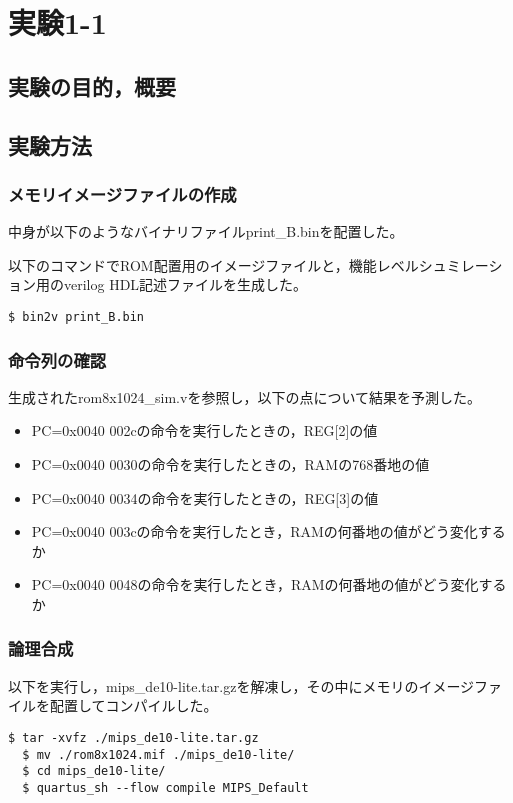 
\section{実験1-1}
\subsection{実験の目的，概要}

\subsection{実験方法}
\subsubsection{メモリイメージファイルの作成}
中身が以下のようなバイナリファイルprint\_B.binを配置した。


以下のコマンドでROM配置用のイメージファイルと，機能レベルシュミレーション用のverilog HDL記述ファイルを生成した。
\begin{lstlisting}[caption={イメージファイルの作成},label={イメージファイルの作成1-1}]
  $ bin2v print_B.bin
\end{lstlisting}

\subsubsection{命令列の確認}
生成されたrom8x1024\_sim.vを参照し，以下の点について結果を予測した。
\begin{itemize}
  \item PC=0x0040 002cの命令を実行したときの，REG[2]の値
  \item PC=0x0040 0030の命令を実行したときの，RAMの768番地の値
  \item PC=0x0040 0034の命令を実行したときの，REG[3]の値
  \item PC=0x0040 003cの命令を実行したとき，RAMの何番地の値がどう変化するか
  \item PC=0x0040 0048の命令を実行したとき，RAMの何番地の値がどう変化するか
\end{itemize}

\subsubsection{論理合成}
以下を実行し，mips\_de10-lite.tar.gzを解凍し，その中にメモリのイメージファイルを配置してコンパイルした。
\begin{lstlisting}[caption={論理合成操作},label={論理合成操作1-1}]
  $ tar -xvfz ./mips_de10-lite.tar.gz
  $ mv ./rom8x1024.mif ./mips_de10-lite/
  $ cd mips_de10-lite/
  $ quartus_sh --flow compile MIPS_Default
\end{lstlisting}

